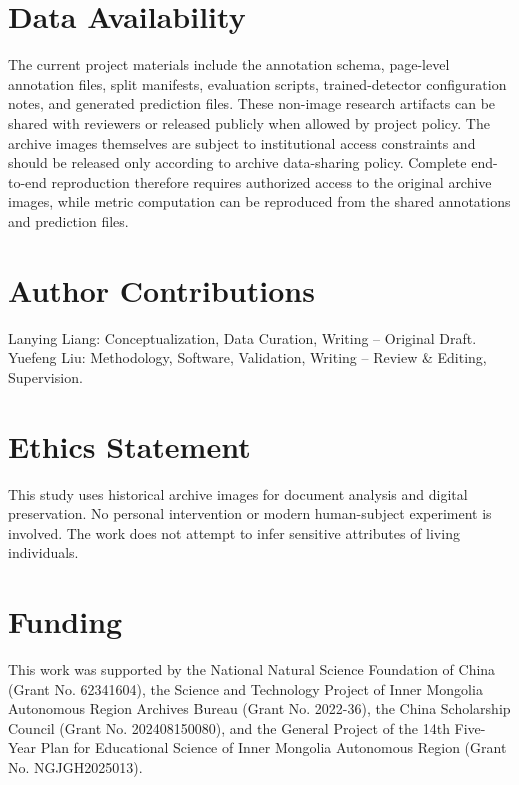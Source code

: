 \documentclass[pdflatex,sn-mathphys-num]{sn-jnl}
\begin{document}
\section*{Data Availability}
The current project materials include the annotation schema, page-level annotation files, split manifests, evaluation scripts, trained-detector configuration notes, and generated prediction files. These non-image research artifacts can be shared with reviewers or released publicly when allowed by project policy. The archive images themselves are subject to institutional access constraints and should be released only according to archive data-sharing policy. Complete end-to-end reproduction therefore requires authorized access to the original archive images, while metric computation can be reproduced from the shared annotations and prediction files.

\section*{Author Contributions}
Lanying Liang: Conceptualization, Data Curation, Writing -- Original Draft. Yuefeng Liu: Methodology, Software, Validation, Writing -- Review \& Editing, Supervision.

\section*{Ethics Statement}
This study uses historical archive images for document analysis and digital preservation. No personal intervention or modern human-subject experiment is involved. The work does not attempt to infer sensitive attributes of living individuals.

\section*{Funding}
This work was supported by the National Natural Science Foundation of China (Grant No. 62341604), the Science and Technology Project of Inner Mongolia Autonomous Region Archives Bureau (Grant No. 2022-36), the China Scholarship Council (Grant No. 202408150080), and the General Project of the 14th Five-Year Plan for Educational Science of Inner Mongolia Autonomous Region (Grant No. NGJGH2025013).
\end{document}
